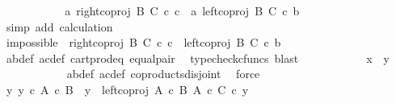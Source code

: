 \begin{isabellebody}
\ \ \ \ \ \ \ \ \isamarkupfalse%
\ \isamarkupfalse%
\ {\isachardoublequoteopen}{\isasymlangle}a{\isacharcomma}{\kern0pt}\ right{\isacharunderscore}{\kern0pt}coproj\ B\ C\ {\isasymcirc}\isactrlsub c\ c{\isasymrangle}\ {\isacharequal}{\kern0pt}\ {\isasymlangle}a{\isacharprime}{\kern0pt}{\isacharcomma}{\kern0pt}\ left{\isacharunderscore}{\kern0pt}coproj\ B\ C\ {\isasymcirc}\isactrlsub c\ b{\isacharprime}{\kern0pt}{\isasymrangle}{\isachardoublequoteclose}\isanewline
\ \ \ \ \ \ \ \ \ \ \isamarkupfalse%
\ {\isacharparenleft}{\kern0pt}simp\ add{\isacharcolon}{\kern0pt}\ calculation{\isacharparenright}{\kern0pt}\isanewline
\ \ \ \ \ \ \isamarkupfalse%
\ \ \ \ \ \ \ \ \isanewline
\ \ \ \ \ \ \isamarkupfalse%
\ \isamarkupfalse%
\ impossible{\isacharcolon}{\kern0pt}\ \ {\isachardoublequoteopen}right{\isacharunderscore}{\kern0pt}coproj\ B\ C\ {\isasymcirc}\isactrlsub c\ c\ {\isacharequal}{\kern0pt}\ left{\isacharunderscore}{\kern0pt}coproj\ B\ C\ {\isasymcirc}\isactrlsub c\ b{\isacharprime}{\kern0pt}{\isachardoublequoteclose}\isanewline
\ \ \ \ \ \ \ \ \ \ \isamarkupfalse%
\ a{\isacharprime}{\kern0pt}b{\isacharprime}{\kern0pt}{\isacharunderscore}{\kern0pt}def\ ac{\isacharunderscore}{\kern0pt}def\ cart{\isacharunderscore}{\kern0pt}prod{\isacharunderscore}{\kern0pt}eq{}\ equal{\isacharunderscore}{\kern0pt}pair\ \isamarkupfalse%
\ {\isacharparenleft}{\kern0pt}typecheck{\isacharunderscore}{\kern0pt}cfuncs{\isacharcomma}{\kern0pt}\ blast{\isacharparenright}{\kern0pt}\isanewline
\ \ \ \ \ \ \ \ \isamarkupfalse%
\ \isamarkupfalse%
\ {\isachardoublequoteopen}x\ {\isacharequal}{\kern0pt}\ y{\isachardoublequoteclose}\isanewline
\ \ \ \ \ \ \ \ \ \ \isamarkupfalse%
\ a{\isacharprime}{\kern0pt}b{\isacharprime}{\kern0pt}{\isacharunderscore}{\kern0pt}def\ ac{\isacharunderscore}{\kern0pt}def\ coproducts{\isacharunderscore}{\kern0pt}disjoint\ \isamarkupfalse%
\ force\isanewline
\ \ \ \ \ \ \isamarkupfalse%
\ \isanewline
\ \ \ \ \ \ \ \ \isamarkupfalse%
\ {\isachardoublequoteopen}{\isasymnexists}y{\isacharprime}{\kern0pt}{\isachardot}{\kern0pt}\ y{\isacharprime}{\kern0pt}\ {\isasymin}\isactrlsub c\ A\ {\isasymtimes}\isactrlsub c\ B\ {\isasymand}\ y\ {\isacharequal}{\kern0pt}\ left{\isacharunderscore}{\kern0pt}coproj\ {\isacharparenleft}{\kern0pt}A\ {\isasymtimes}\isactrlsub c\ B{\isacharparenright}{\kern0pt}\ {\isacharparenleft}{\kern0pt}A\ {\isasymtimes}\isactrlsub c\ C{\isacharparenright}{\kern0pt}\ {\isasymcirc}\isactrlsub c\ y{\isacharprime}{\kern0pt}{\isachardoublequoteclose}\isanewline

\end{isabellebody}
